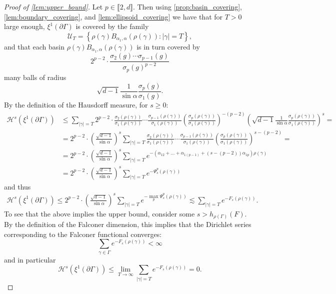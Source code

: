 \documentclass{report}
\begin{document}
\begin{proof}[Proof of \cref{lem:upper_bound}]
Let $p \in \llbracket 2, d \rrbracket$.
Then using \cref{prop:basin_covering}, \cref{lem:boundary_covering}, and \cref{lem:ellipsoid_covering} we have that for $T>0$ large enough, $\xi^1(\partial \Gamma)$ is covered by the family
\[
    \mathcal U_T = \left\{ \rho(\gamma) B_{\alpha_1, \alpha}(\rho(\gamma)) : |\gamma| = T \right\},
\]
and that each basin $\rho(\gamma) B_{\alpha_1, \alpha}(\rho(\gamma))$ is in turn covered by
\[
    2^{p-2} \cdot \frac{\sigma_2(g) \cdots \sigma_{p-1}(g)}{\sigma_p(g)^{p-2}}
\]
many balls of radius
\[
    \sqrt{d-1} \frac{1}{\sin \alpha} \frac{\sigma_p(g)}{\sigma_1(g)}.
\]
By the definition of the Hausdorff measure, for $s \geq 0$:
\begin{align*}
    \mathcal H^s(\xi^1(\partial \Gamma)) &\leq
    \sum_{|\gamma| = T}
        2^{p-2} \cdot 
        \frac{\sigma_2(\rho(\gamma))}{\sigma_1(\rho(\gamma))} \cdots 
            \frac{\sigma_{p-1}(\rho(\gamma))}{\sigma_1(\rho(\gamma))}
        \left(
            \frac{\sigma_p(\rho(\gamma))}{\sigma_1(\rho(\gamma))}
        \right)^{-(p-2)}
        \left(
            \sqrt{d-1} \frac{1}{\sin \alpha} \frac{\sigma_p(\rho(\gamma))}{\sigma_1(\rho(\gamma))}
        \right)^s =\\
        &=
        2^{p-2} \cdot \left( \frac{\sqrt{d-1}}{\sin \alpha}\right)^s  
        \sum_{|\gamma| = T} 
        \frac{\sigma_2(\rho(\gamma))}{\sigma_1(\rho(\gamma))} \cdots 
            \frac{\sigma_{p-1}(\rho(\gamma))}{\sigma_1(\rho(\gamma))}
        \left(
            \frac{\sigma_p(\rho(\gamma))}{\sigma_1(\rho(\gamma))}
        \right)^{s-(p-2)} =\\
        &=
        2^{p-2} \cdot \left( \frac{\sqrt{d-1}}{\sin \alpha}\right)^s  
        \sum_{|\gamma| = T}
        e^{-\left( \alpha_{1 2} + \ldots + \alpha_{1 (p-1)} + (s - (p-2))\alpha_{1 p} \right)\rho(\gamma)}\\
        &=
        2^{p-2} \cdot \left( \frac{\sqrt{d-1}}{\sin \alpha}\right)^s  
        \sum_{|\gamma| = T}
        e^{-\Psi_s^p(\rho(\gamma))}
\end{align*}
and thus
\begin{align*}
    \mathcal H^s(\xi^1(\partial \Gamma)) \leq
    2^{p-2} \cdot \left( \frac{\sqrt{d-1}}{\sin \alpha}\right)^s
    \sum_{|\gamma| = T}
    e^{-\max_p \Psi_s^p(\rho(\gamma)) }\lesssim \sum_{|\gamma| = T} e^{-F_s(\rho(\gamma))}.
\end{align*}
To see that the above implies the upper bound, consider some $s > h_{\rho(\Gamma)}(F)$.
By the definition of the Falconer dimension, this implies that the Dirichlet series corresponding to the Falconer functional converges:
\[
    \sum_{\gamma \in \Gamma} e^{-F_s(\rho(\gamma))} < \infty
\]
and in particular
\[
    \mathcal H^s(\xi^1(\partial \Gamma)) \leq 
    \lim_{T \to \infty} \sum_{|\gamma| = T} e^{-F_s(\rho(\gamma))} = 0.
\]
\end{proof}
\end{document}
